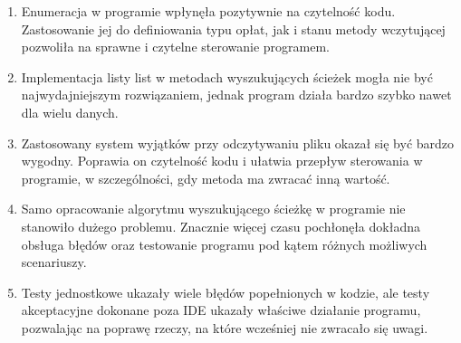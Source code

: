 \documentclass[a4paper,12pt]{article}
\begin{document}
\begin{enumerate}

\item Enumeracja w programie wpłynęła pozytywnie na czytelność kodu. Zastosowanie jej do definiowania typu opłat, jak i stanu metody wczytującej pozwoliła na sprawne i czytelne sterowanie programem.

\item Implementacja listy list w metodach wyszukujących ścieżek mogła nie być najwydajniejszym rozwiązaniem, jednak program działa bardzo szybko nawet dla wielu danych.

\item Zastosowany system wyjątków przy odczytywaniu pliku okazał się być bardzo wygodny. Poprawia on czytelność kodu i ułatwia przepływ sterowania w programie, w szczególności, gdy metoda ma zwracać inną wartość.

\item Samo opracowanie algorytmu wyszukującego ścieżkę w programie nie stanowiło dużego problemu. Znacznie więcej czasu pochłonęła dokładna obsługa błędów oraz testowanie programu pod kątem różnych możliwych scenariuszy.

\item Testy jednostkowe ukazały wiele błędów popełnionych w kodzie, ale testy akceptacyjne dokonane poza IDE ukazały właściwe działanie programu, pozwalając na poprawę rzeczy, na które wcześniej nie zwracało się uwagi.

\end{enumerate}
\end{document}
